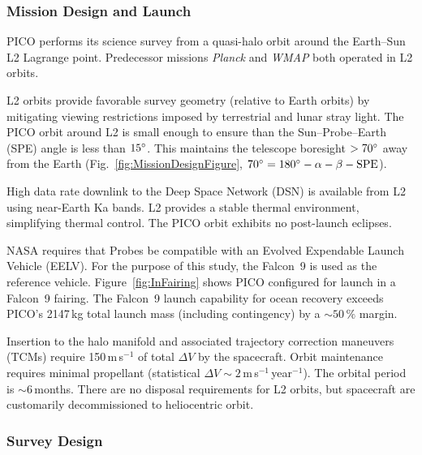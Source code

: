 
\subsubsection{Mission Design and Launch}
\label{sec:mission_design} %

PICO performs its science survey from a quasi-halo orbit around the
Earth--Sun L2 Lagrange point. Predecessor missions \textit{Planck} and
\textit{WMAP} both operated in L2 orbits.

L2 orbits provide favorable survey geometry (relative to Earth orbits)
by mitigating viewing restrictions imposed by terrestrial and lunar
stray light. The PICO orbit around L2 is small enough to ensure than
the Sun--Probe--Earth (SPE) angle is less than $15^\circ$. This
maintains the telescope boresight $>70^\circ$ away from the Earth
(Fig.~\ref{fig:MissionDesignFigure},
$70^\circ = 180^\circ -\alpha - \beta - \rm{SPE}$).

%

High data rate downlink to the Deep Space Network (DSN) is available
from L2 using near-Earth Ka bands. L2 provides a stable thermal
environment, simplifying thermal control. The PICO orbit exhibits no
post-launch eclipses.
 
NASA requires that Probes be compatible with an Evolved Expendable
Launch Vehicle (EELV). For the purpose of this study, the Falcon~9
\citep{SpaceX2015} is used as the reference
vehicle. Figure~\ref{fig:InFairing} shows PICO configured for launch
in a Falcon~9 fairing. The Falcon~9 launch capability for ocean
recovery exceeds PICO's 2147\,kg total launch mass (including contingency) by a
$\sim 50\,\%$ margin.

Insertion to the halo manifold and associated trajectory correction
maneuvers (TCMs) require 150\,m\,s$^{-1}$ of total $\Delta V$ by the
spacecraft. Orbit maintenance requires minimal propellant (statistical
$\Delta V\sim 2$\,m\,s$^{-1}$\,year$^{-1}$). The orbital period is $\sim6$\,months.
There are no disposal requirements for L2 orbits, but spacecraft are customarily
decommissioned to heliocentric orbit.


\subsubsection{Survey Design}
\label{sec:survey_design} %
 
